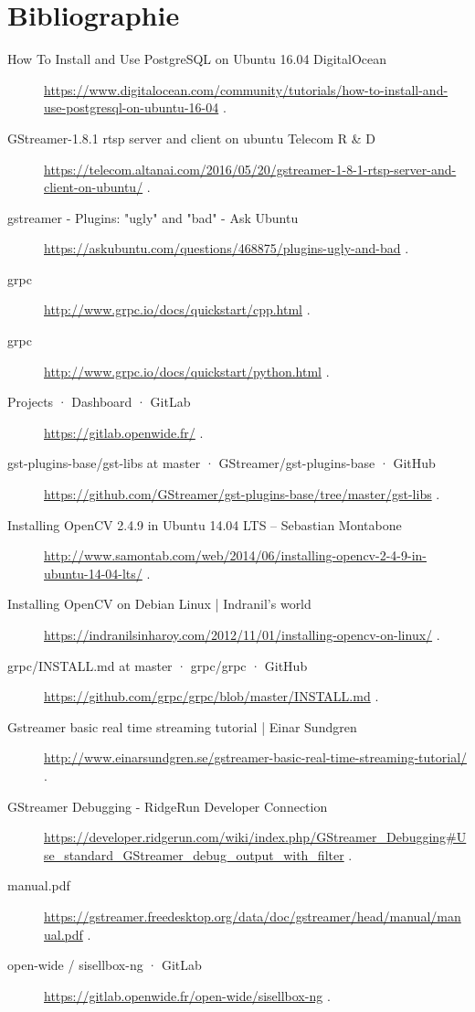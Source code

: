 \chapter{Bibliographie}

\begin{description} 
\item [How To Install and Use PostgreSQL on Ubuntu 16.04 DigitalOcean] \url{https://www.digitalocean.com/community/tutorials/how-to-install-and-use-postgresql-on-ubuntu-16-04} . 
\item [GStreamer-1.8.1 rtsp server and client on ubuntu Telecom R \& D] \url{https://telecom.altanai.com/2016/05/20/gstreamer-1-8-1-rtsp-server-and-client-on-ubuntu/} . 
\item [gstreamer - Plugins: "ugly" and "bad" - Ask Ubuntu] \url{https://askubuntu.com/questions/468875/plugins-ugly-and-bad} . 
\item [grpc] \url{http://www.grpc.io/docs/quickstart/cpp.html} . 
\item [grpc] \url{http://www.grpc.io/docs/quickstart/python.html} . 
\item [Projects · Dashboard · GitLab] \url{https://gitlab.openwide.fr/} . 
\item [gst-plugins-base/gst-libs at master · GStreamer/gst-plugins-base · GitHub] \url{https://github.com/GStreamer/gst-plugins-base/tree/master/gst-libs} . 
\item [Installing OpenCV 2.4.9 in Ubuntu 14.04 LTS – Sebastian Montabone] \url{http://www.samontab.com/web/2014/06/installing-opencv-2-4-9-in-ubuntu-14-04-lts/} . 
\item [Installing OpenCV on Debian Linux | Indranil's world] \url{https://indranilsinharoy.com/2012/11/01/installing-opencv-on-linux/} . 
\item [grpc/INSTALL.md at master · grpc/grpc · GitHub] \url{https://github.com/grpc/grpc/blob/master/INSTALL.md} . 
\item [Gstreamer basic real time streaming tutorial | Einar Sundgren] \url{http://www.einarsundgren.se/gstreamer-basic-real-time-streaming-tutorial/} . 
\item [GStreamer Debugging - RidgeRun Developer Connection] \url{https://developer.ridgerun.com/wiki/index.php/GStreamer_Debugging#Use_standard_GStreamer_debug_output_with_filter} . 
\item [manual.pdf] \url{https://gstreamer.freedesktop.org/data/doc/gstreamer/head/manual/manual.pdf} . 
\item [open-wide / sisellbox-ng · GitLab] \url{https://gitlab.openwide.fr/open-wide/sisellbox-ng} . 

\end{description}
